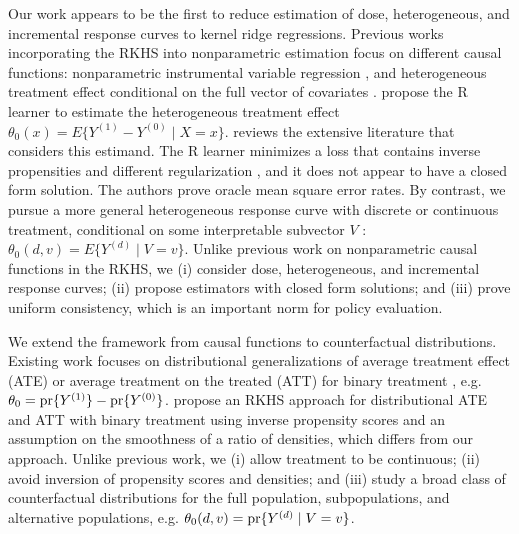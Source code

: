 Our work appears to be the first to reduce estimation of dose, heterogeneous, and incremental response curves to kernel ridge regressions. Previous works incorporating the RKHS into nonparametric estimation focus on different causal functions: nonparametric instrumental variable regression \cite{carrasco2007linear,darolles2011nonparametric,singh2019kernel}, and heterogeneous treatment effect conditional on the full vector of covariates \cite{nie2021quasi}. %
\cite{nie2021quasi} propose the R learner to estimate the heterogeneous treatment effect $\theta_0(x)=E\{Y^{(1)}-Y^{(0)} \mid X=x\}$. \cite[Section 3]{nie2021quasi} reviews the extensive literature that considers this estimand. The R learner minimizes a loss that contains inverse propensities and different regularization \cite[eq. A24]{nie2021quasi}, and it does not appear to have a closed form solution. The authors prove oracle mean square error rates. By contrast, we pursue a more general heterogeneous response curve with discrete or continuous treatment, conditional on some interpretable subvector $V$ \cite{abrevaya2015estimating}: $\theta_0(d,v)=E\{Y^{(d)} \mid V=v\}$. Unlike previous work on nonparametric causal functions in the RKHS, we (i) consider dose, heterogeneous, and incremental response curves; (ii) propose estimators with closed form solutions; and (iii) prove uniform consistency, which is an important norm for policy evaluation.

We extend the framework from causal functions to counterfactual distributions. Existing work focuses on distributional generalizations of average treatment effect (ATE) or average treatment on the treated (ATT) for binary treatment \cite{firpo2007efficient,cattaneo2010efficient,chernozhukov2013inference}, e.g. $\theta_0=\text{\normalfont pr}\{Y^{(1)}\}-\text{\normalfont pr}\{Y^{(0)}\}$. \cite{muandet2021counterfactual} propose an RKHS approach for distributional ATE and ATT with binary treatment using inverse propensity scores and an assumption on the smoothness of a ratio of densities, which differs from our approach. Unlike previous work, we (i) allow treatment to be continuous; (ii) avoid inversion of propensity scores and densities; and (iii) study a broad class of counterfactual distributions for the full population, subpopulations, and alternative populations, e.g. $\theta_0(d,v)=\text{\normalfont pr}\{Y^{(d)} \mid V=v\}$. 

